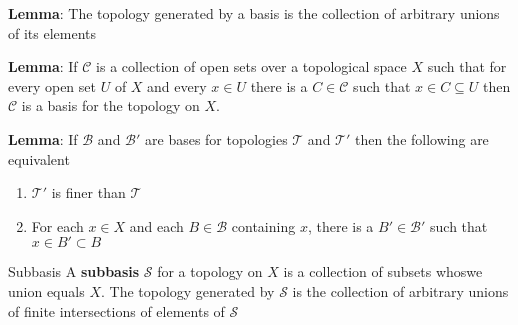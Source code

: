 \documentclass[titlepage, 12pt]{article}
\begin{document}
\textbf{Lemma}: The topology generated by a basis is the collection of arbitrary
unions of its elements

\textbf{Lemma}: If $\mathcal{C}$ is a collection of open sets over a topological
space $X$ such that for every open set $U$ of $X$ and every $x\in U$ there is a
$C\in\mathcal{C}$ such that $x\in C\subseteq U$ then $\mathcal{C}$ is a basis
for the topology on $X$.

\textbf{Lemma}: If $\mathcal{B}$ and $\mathcal{B}'$ are bases for topologies
$\mathcal{T}$ and $\mathcal{T}'$ then the following are equivalent
\begin{enumerate}
    \item $\mathcal{T}'$ is finer than $\mathcal{T}$
    \item For each $x\in X$ and each $B\in\mathcal{B}$ containing $x$, there is
        a $B'\in\mathcal{B}'$ such that $x\in B'\subset B$
\end{enumerate}

\begin{definition}{Subbasis}{}
    A \textbf{subbasis} $\mathcal{S}$ for a topology on $X$ is a collection of
    subsets whoswe union equals $X$. The topology generated by $\mathcal{S}$ is
    the collection of arbitrary unions of finite intersections of elements of
    $\mathcal{S}$
\end{definition}
\end{document}
